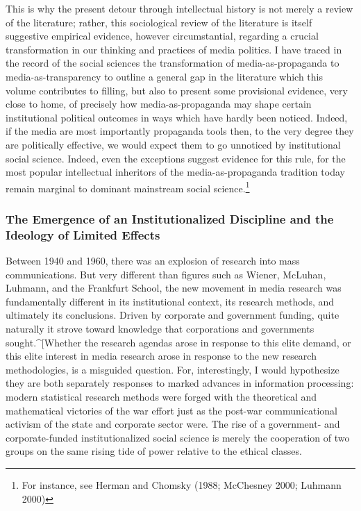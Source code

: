 \documentclass[12pt,book]{article}
\begin{document}
This is why the present detour through intellectual history is not
merely a review of the literature; rather, this sociological review of
the literature is itself suggestive empirical evidence, however
circumstantial, regarding a crucial transformation in our thinking and
practices of media politics. I have traced in the record of the social
sciences the transformation of media-as-propaganda to
media-as-transparency to outline a general gap in the literature which
this volume contributes to filling, but also to present some provisional
evidence, very close to home, of precisely how media-as-propaganda may
shape certain institutional political outcomes in ways which have hardly
been noticed. Indeed, if the media are most importantly propaganda tools
then, to the very degree they are politically effective, we would expect
them to go unnoticed by institutional social science. Indeed, even the
exceptions suggest evidence for this rule, for the most popular
intellectual inheritors of the media-as-propaganda tradition today
remain marginal to dominant mainstream social science.\footnote{For
  instance, see Herman and Chomsky (1988; McChesney 2000; Luhmann 2000)}

\subsubsection{The Emergence of an Institutionalized Discipline and the
Ideology of Limited
Effects}\label{the-emergence-of-an-institutionalized-discipline-and-the-ideology-of-limited-effects}

Between 1940 and 1960, there was an explosion of research into mass
communications. But very different than figures such as Wiener, McLuhan,
Luhmann, and the Frankfurt School, the new movement in media research
was fundamentally different in its institutional context, its research
methods, and ultimately its conclusions. Driven by corporate and
government funding, quite naturally it strove toward knowledge that
corporations and governments sought.\^{}{[}Whether the research agendas
arose in response to this elite demand, or this elite interest in media
research arose in response to the new research methodologies, is a
misguided question. For, interestingly, I would hypothesize they are
both separately responses to marked advances in information processing:
modern statistical research methods were forged with the theoretical and
mathematical victories of the war effort just as the post-war
communicational activism of the state and corporate sector were. The
rise of a government- and corporate-funded institutionalized social
science is merely the cooperation of two groups on the same rising tide
of power relative to the ethical classes.
\end{document}
